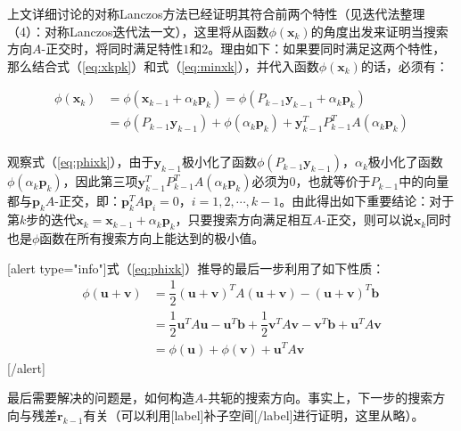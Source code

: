 \documentclass[UTF8,nofonts]{ctexart}
\begin{document}
上文详细讨论的对称Lanczos方法已经证明其符合前两个特性（见迭代法整理（4）：对称Lanczos迭代法一文），这里将从函数$\phi(\boldsymbol{x}_k)$的角度出发来证明当搜索方向$A$-正交时，将同时满足特性$1$和$2$。理由如下：如果要同时满足这两个特性，那么结合式（\ref{eq:xkpk}）和式（\ref{eq:minxk}），并代入函数$\phi(\boldsymbol{x}_k)$的话，必须有：

\begin{equation}
	\label{eq:phixk}
	\begin{aligned}
		\phi(\boldsymbol{x}_k) &= \phi(\boldsymbol{x}_{k-1} + \alpha_k\boldsymbol{p}_k) = \phi(P_{k-1}\boldsymbol{y}_{k-1} + \alpha_k\boldsymbol{p}_k) \\
		&= \phi(P_{k-1}\boldsymbol{y}_{k-1}) + \phi(\alpha_k\boldsymbol{p}_k) + \boldsymbol{y}_{k-1}^TP_{k-1}^TA(\alpha_k\boldsymbol{p}_k) \\
	\end{aligned}
\end{equation}

观察式（\ref{eq:phixk}），由于$\boldsymbol{y}_{k-1}$极小化了函数$\phi(P_{k-1}\boldsymbol{y}_{k-1})$，$\alpha_k$极小化了函数$\phi(\alpha_k\boldsymbol{p}_k)$，因此第三项$\boldsymbol{y}_{k-1}^TP_{k-1}^TA(\alpha_k\boldsymbol{p}_k)$必须为$0$，也就等价于$P_{k-1}$中的向量都与$\boldsymbol{p}_k$$A$-正交，即：$\boldsymbol{p}_k^TA\boldsymbol{p}_i=0$，$i=1,2,\cdots,k-1$。由此得出如下重要结论：对于第$k$步的迭代$\boldsymbol{x}_k=\boldsymbol{x}_{k-1}+\alpha_k\boldsymbol{p}_k$，只要搜索方向满足相互$A$-正交，则可以说$\boldsymbol{x}_k$同时也是$\phi$函数在所有搜索方向上能达到的极小值。

[alert type="info"]式（\ref{eq:phixk}）推导的最后一步利用了如下性质：\[
	\begin{aligned}
		\phi(\boldsymbol{u} + \boldsymbol{v}) &=
		\dfrac{1}{2}(\boldsymbol{u} + \boldsymbol{v})^TA(\boldsymbol{u} + \boldsymbol{v}) - (\boldsymbol{u} + \boldsymbol{v})^T\boldsymbol{b} \\
		&= \dfrac{1}{2}\boldsymbol{u}^TA\boldsymbol{u} - \boldsymbol{u}^T\boldsymbol{b} + \dfrac{1}{2}\boldsymbol{v}^TA\boldsymbol{v} - \boldsymbol{v}^T\boldsymbol{b} + \boldsymbol{u}^TA\boldsymbol{v} \\
		&= \phi(\boldsymbol{u}) + \phi(\boldsymbol{v}) + \boldsymbol{u}^TA\boldsymbol{v}
	\end{aligned}
\][/alert]

最后需要解决的问题是，如何构造$A$-共轭的搜索方向。事实上，下一步的搜索方向与残差$\boldsymbol{r}_{k-1}$有关（可以利用[label]补子空间[/label]进行证明，这里从略）。
\end{document}
